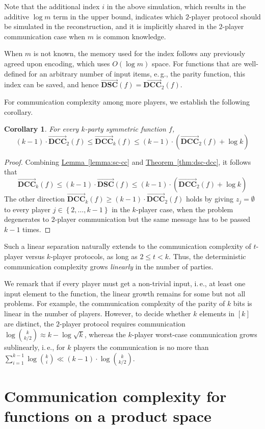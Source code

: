 \documentclass[11pt]{article}
\numberwithin{equation}{section}
\newtheorem{corollary}[theorem]{Corollary}
\theoremstyle{definition}
\theoremstyle{plain}
\newcommand{\ie}{i.\,e.}
\newcommand{\eg}{e.\,g.}
\newcommand{\expref}[2]{\hyperref[#2]{#1~\ref{#2}}}
\newcommand{\set}[1]{{\left \{{#1} \right \}}}
\newcommand{\dccone}{\ensuremath{\overrightarrow{\mathbf{DCC}}}}
\newcommand{\dscone}{\ensuremath{\overrightarrow{\mathbf{DSC}}}}
\begin{document}
Note that the additional index $i$ in the above simulation, which results in the additive $\log m$ term in the upper bound, indicates which $2$-player protocol should be simulated in the reconstruction,
and it is implicitly shared in the $2$-player communication case when $m$ is common knowledge.

When $m$ is not known, the memory used for the index follows any previously agreed upon encoding, which uses $O(\log m)$ space.
For functions that are well-defined for an arbitrary number of input items,
\eg, the parity function, this index can be saved, and hence $\dscone(f) = \dccone_2(f)$.

For communication complexity among more players, we establish the following corollary.
\begin{corollary}\label{corollary:dcck-dcc2} 
	For every $k$-party symmetric function $f$,		
	\[ (k-1) \cdot \dccone_2(f) \le \dccone_k(f)  \le  (k-1) \cdot \left(\dccone_2(f) +\log k\right) \]
\end{corollary}
\begin{proof}
	Combining \expref{Lemma}{lemma:sc-cc} and \expref{Theorem}{thm:dsc-dcc}, it follows that
	\[\dccone_k(f) \le (k-1) \cdot \dscone(f) \le (k-1) \cdot \left(\dccone_2(f) +\log k\right)\]
	The other direction $\dccone_k(f) \ge (k-1) \cdot \dccone_2(f)$ holds by giving $z_j=\emptyset$ to every player $j\in\set{2,\dots, k-1}$ in the $k$-player case, when the problem degenerates to $2$-player communication but the same message has to be passed $k-1$ times. 
\end{proof}

Such a linear separation naturally extends to the communication complexity of $t$-player versus $k$-player protocols, as long as $2\le t<k$.
Thus, the deterministic communication complexity grows \emph{linearly} in the number of parties.

We remark that if every player must get a non-trivial input, \ie, at least one input element to the function, the linear growth remains for some but not all problems.
For example, the communication complexity of the parity of $k$ bits is linear in the number of players.
However, to decide whether $k$ elements in $[k]$ are distinct, the $2$-player protocol requires communication $\log\binom{k}{k/2}\approx k-\log\sqrt{k}$, whereas the $k$-player worst-case communication grows sublinearly, \ie, for $k$ players the communication is no more than $\sum_{i=1}^{k-1} \log\binom{k}{i} \ll (k-1)\cdot \log \binom{k}{k/2}$.


\section{Communication complexity for functions on a product space}
\label{sec:total}
\end{document}
